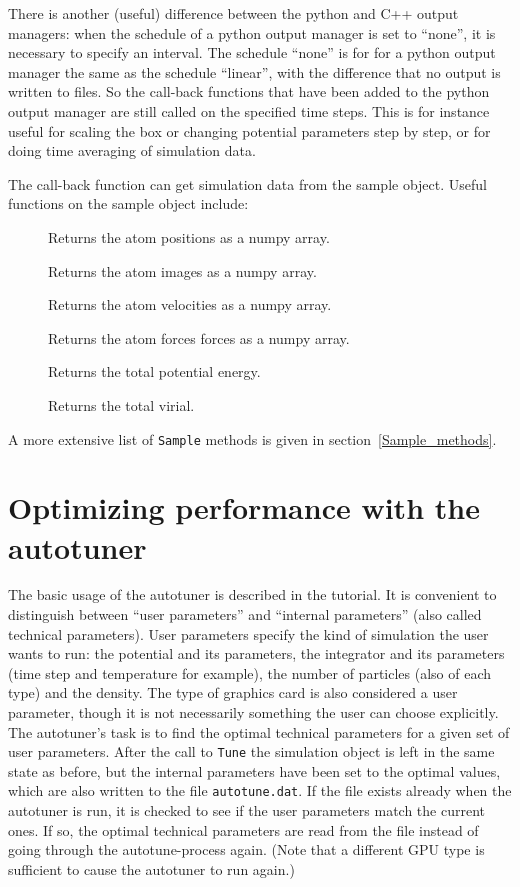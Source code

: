 \documentclass[a4paper]{article}
\begin{document}
There is another (useful) difference between the python and C++ output managers: when the schedule of a python output manager is set to ``none'', it is necessary to specify an interval. The schedule ``none'' is for for a python output manager the same as the schedule ``linear'', with the difference that no output is written to files. So the call-back functions that have been added to the python output manager are still called on the specified time steps. This is for instance useful for scaling the box or changing potential parameters step by step, or for doing time averaging of simulation data.

The call-back function can get simulation data from the sample object. Useful
 functions on the sample object include:
\begin{description}
\item[] Returns the atom positions as a numpy array.
\item[] Returns the atom images as a numpy array.
\item[] Returns the atom velocities as a numpy array.
\item[] Returns the atom forces forces as a numpy array.
\item[] Returns the total potential energy.
\item[] Returns the total virial.
\end{description}
A more extensive list of \verb|Sample| methods is given in section~\ref{Sample_methods}.



\section{Optimizing performance with the autotuner}

The basic usage of the autotuner is described in the tutorial. It is convenient
to distinguish between ``user parameters'' and ``internal parameters'' (also
called technical parameters). User parameters specify the kind of simulation
the user wants to run: the potential and its parameters, the integrator and its
parameters (time step and temperature for example), the number of particles
(also of each type)
and the density. The type of graphics card is also considered a user parameter,
though it is not necessarily something the user can choose explicitly. The 
autotuner's task is to find the optimal technical parameters for a given set
of user parameters. After the call to \verb|Tune| the simulation object is left
in the same state as before, but the internal parameters have been set to the
optimal values, which are also written to the file \verb|autotune.dat|. If the 
file exists already when the autotuner is run, it is checked to see if the user
parameters match the current ones. If so, the optimal technical parameters are
read from the file instead of going through the autotune-process again. (Note
that a different GPU type is sufficient to cause the autotuner to run again.)
\end{document}

